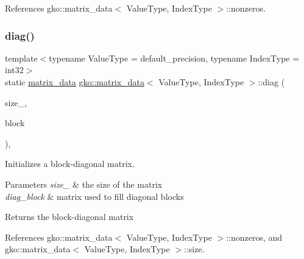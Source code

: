 References gko\+::matrix\+\_\+data$<$ Value\+Type, Index\+Type $>$\+::nonzeros.

\mbox{\label{structgko_1_1matrix__data_a2d2fb8725ef69679a74f7bd2f627e776}} 
\subsubsection{\texorpdfstring{diag()}{diag()}\hspace{0.1cm}{\footnotesize\ttfamily [3/5]}}
{\footnotesize\ttfamily template$<$typename Value\+Type = default\+\_\+precision, typename Index\+Type = int32$>$ \\
static \hyperlink{structgko_1_1matrix__data}{matrix\+\_\+data} \hyperlink{structgko_1_1matrix__data}{gko\+::matrix\+\_\+data}$<$ Value\+Type, Index\+Type $>$\+::diag (\begin{DoxyParamCaption}\item[{\hyperlink{structgko_1_1dim}{dim}$<$ 2 $>$}]{size\+\_\+,  }\item[{const \hyperlink{structgko_1_1matrix__data}{matrix\+\_\+data}$<$ Value\+Type, Index\+Type $>$ \&}]{block }\end{DoxyParamCaption})\hspace{0.3cm}{\ttfamily [inline]}, {\ttfamily [static]}}



Initializes a block-\/diagonal matrix. 


\begin{DoxyParams}{Parameters}
{\em size\+\_\+} & the size of the matrix \\
\hline
{\em diag\+\_\+block} & matrix used to fill diagonal blocks\\
\hline
\end{DoxyParams}
\begin{DoxyReturn}{Returns}
the block-\/diagonal matrix 
\end{DoxyReturn}


References gko\+::matrix\+\_\+data$<$ Value\+Type, Index\+Type $>$\+::nonzeros, and gko\+::matrix\+\_\+data$<$ Value\+Type, Index\+Type $>$\+::size.

\mbox{\label{structgko_1_1matrix__data_a83d309b12caf3957c116ed1133da39a7}} 
